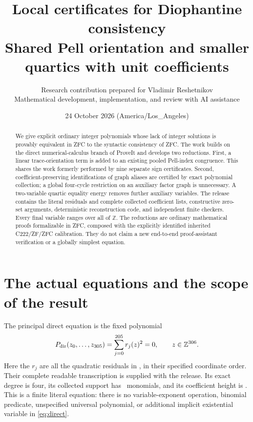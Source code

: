 \documentclass[11pt,letterpaper]{article}
\title{Local certificates for Diophantine consistency\\[3pt]\large Shared Pell orientation and smaller quartics with unit coefficients}
\author{Research contribution prepared for Vladimir Reshetnikov\\\small Mathematical development, implementation, and review with AI assistance}
\date{24 October 2026 (America/Los\_Angeles)}
\theoremstyle{definition}\newtheorem{definition}[theorem]{Definition}
\theoremstyle{remark}\newtheorem{remark}[theorem]{Remark}
\newcommand{\Z}{\mathbb Z}\newcommand{\N}{\mathbb N}\newcommand{\R}{\mathbb R}
\begin{document}
\maketitle
\begin{abstract}
We give explicit ordinary integer polynomials whose lack of integer solutions
is provably equivalent in ZFC to the syntactic consistency of ZFC. The work
builds on the direct numerical-calculus branch of ProveIt and develops two
reductions. First, a linear trace-orientation term is added to an existing
pooled Pell-index congruence. This shares the work formerly performed by nine
separate sign certificates. Second, coefficient-preserving identifications of
graph aliases are certified by exact polynomial collection; a global
four-cycle restriction on an auxiliary factor graph is unnecessary. A
two-variable quartic equality energy removes further auxiliary variables.
The release contains the literal residuals and complete collected coefficient
lists, constructive zero-set arguments, deterministic reconstruction code,
and independent finite checkers. Every final variable ranges over all of
$\Z$. The reductions are ordinary mathematical proofs formalizable in ZFC,
composed with the explicitly identified inherited C222/ZF/ZFC calibration.
They do not claim a new end-to-end proof-assistant verification or a globally
simplest equation.
\end{abstract}

\section{The actual equations and the scope of the result}
\label{sec:outcome}

The principal direct equation is the fixed polynomial
\begin{equation}\label{eq:direct}
 P_{\mathrm{dir}}(z_0,\ldots,z_{\DirectLast})
   =\sum_{j=0}^{\DirectRowLast} r_j(z)^2=0,
 \qquad z\in\Z^{\DirectVars}.
\end{equation}
Here the $r_j$ are all the quadratic residuals in
, in their specified coordinate order. Their
complete readable transcription is supplied with the release. Its exact
degree is four, its collected support has \DirectTerms\ monomials, and its
coefficient height is \DirectHeight. This is a finite literal equation:
there is no variable-exponent operation, binomial predicate, unspecified
universal polynomial, or additional implicit existential variable in
\eqref{eq:direct}.
\end{document}
